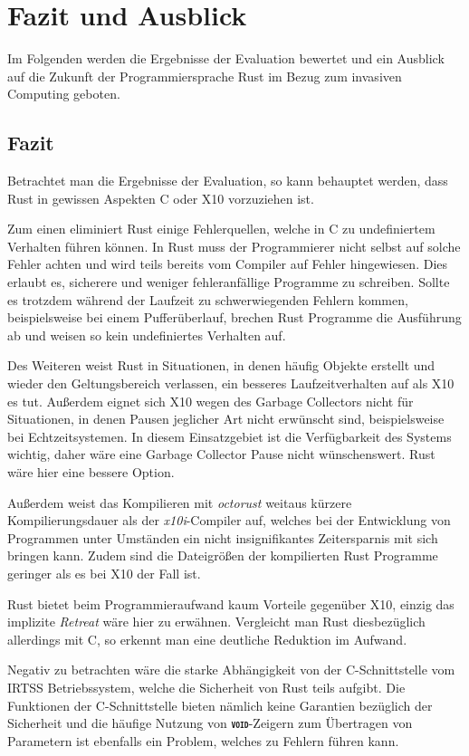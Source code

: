 \chapter{Fazit und Ausblick}\label{sec:conclusion}

Im Folgenden werden die Ergebnisse der Evaluation bewertet
und ein Ausblick auf die Zukunft der Programmiersprache Rust im Bezug zum invasiven Computing geboten.

\section{Fazit}

Betrachtet man die Ergebnisse der Evaluation, so kann behauptet werden,
dass Rust in gewissen Aspekten C oder X10 vorzuziehen ist.

Zum einen eliminiert Rust einige Fehlerquellen, welche in C zu undefiniertem Verhalten führen können.
In Rust muss der Programmierer nicht selbst auf solche Fehler achten und wird teils bereits vom Compiler auf Fehler
hingewiesen. Dies erlaubt es, sicherere und weniger fehleranfällige Programme zu schreiben.
Sollte es trotzdem während der Laufzeit zu schwerwiegenden Fehlern kommen, beispielsweise bei einem Pufferüberlauf,
brechen Rust Programme die Ausführung ab und weisen so kein undefiniertes Verhalten auf.

Des Weiteren weist Rust in Situationen, in denen häufig Objekte erstellt und wieder den Geltungsbereich verlassen,
ein besseres Laufzeitverhalten auf als X10 es tut. Außerdem eignet sich X10 wegen des Garbage Collectors nicht für 
Situationen, in denen Pausen jeglicher Art nicht erwünscht sind, beispielsweise bei Echtzeitsystemen. In diesem
Einsatzgebiet ist die Verfügbarkeit des Systems wichtig, daher wäre eine Garbage Collector Pause nicht
wünschenswert. Rust wäre hier eine bessere Option.

Außerdem weist das Kompilieren mit \textit{octorust} weitaus kürzere Kompilierungsdauer
als der \textit{x10i}-Compiler auf,
welches bei der Entwicklung von Programmen unter Umständen ein nicht insignifikantes Zeitersparnis
mit sich bringen kann. 
Zudem sind die Dateigrößen der kompilierten Rust Programme geringer als es bei X10 der Fall ist.

Rust bietet beim Programmieraufwand kaum Vorteile gegenüber X10, einzig das implizite \textit{Retreat} wäre hier zu 
erwähnen. Vergleicht man Rust diesbezüglich allerdings mit C, so erkennt man eine deutliche Reduktion im Aufwand.

Negativ zu betrachten wäre die starke Abhängigkeit von der C-Schnittstelle vom IRTSS Betriebssystem,
welche die Sicherheit von Rust teils aufgibt. Die Funktionen der C-Schnittstelle bieten nämlich keine Garantien 
bezüglich der Sicherheit und die häufige Nutzung von \texttt{\textsc{\textbf{void}}}-Zeigern zum Übertragen
von Parametern ist ebenfalls ein Problem, welches zu Fehlern führen kann.

